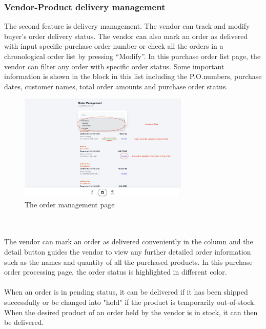 \documentclass{article}
\begin{document}
\subsubsection{Vendor-Product delivery management}
The second feature is delivery management. The vendor can track and modify buyer’s order delivery status. The vendor can also mark an order as delivered with input specific purchase order number or check all the orders in a chronological order list by pressing “Modify”.
In this purchase order list page, the vendor can filter any order with specific order status. Some important information is shown in the block in this list including the P.O.numbers, purchase dates, customer names, total order amounts and purchase order status. 
\begin{figure}[!htp]
    \centering
    \includegraphics[width=0.72\textwidth]{order management.png}
    \caption{\label{fig:order management}The order management page}
\end{figure}
\\\\
The vendor can mark an order as delivered conveniently in the column and the detail button guides the vendor to view any further detailed order information such as the names and quantity of all the purchased products. In this purchase order processing page, the order status is highlighted in different color.
\\\\
When an order is in pending status, it can be delivered if it has been shipped successfully or be changed into "hold" if the product is temporarily out-of-stock. When the desired product of an order held by the vendor is in stock, it can then be delivered.
\end{document}
